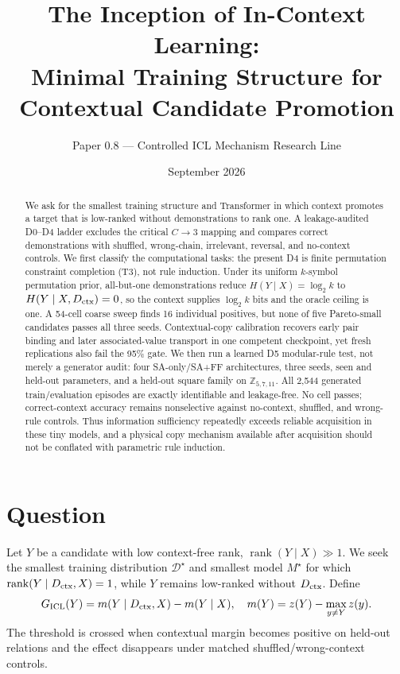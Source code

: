 \documentclass[10pt]{article}
\title{The Inception of In-Context Learning:\\Minimal Training Structure for Contextual Candidate Promotion}
\author{Paper 0.8 --- Controlled ICL Mechanism Research Line}
\date{September 2026}
\begin{document}
\maketitle
\begin{abstract}
We ask for the smallest training structure and Transformer in which context promotes a target that is low-ranked without demonstrations to rank one. A leakage-audited D0--D4 ladder excludes the critical \(C\!\to\!3\) mapping and compares correct demonstrations with shuffled, wrong-chain, irrelevant, reversal, and no-context controls. We first classify the computational tasks: the present D4 is finite permutation constraint completion (T3), not rule induction. Under its uniform \(k\)-symbol permutation prior, all-but-one demonstrations reduce \(H(Y\mid X)=\log_2 k\) to \(H(Y\mid X,D_{\rm ctx})=0\), so the context supplies \(\log_2 k\) bits and the oracle ceiling is one. A 54-cell coarse sweep finds 16 individual positives, but none of five Pareto-small candidates passes all three seeds. Contextual-copy calibration recovers early pair binding and later associated-value transport in one competent checkpoint, yet fresh replications also fail the 95\% gate. We then run a learned D5 modular-rule test, not merely a generator audit: four SA-only/SA+FF architectures, three seeds, seen and held-out parameters, and a held-out square family on \(\mathbb Z_{5,7,11}\). All 2,544 generated train/evaluation episodes are exactly identifiable and leakage-free. No cell passes; correct-context accuracy remains nonselective against no-context, shuffled, and wrong-rule controls. Thus information sufficiency repeatedly exceeds reliable acquisition in these tiny models, and a physical copy mechanism available after acquisition should not be conflated with parametric rule induction.
\end{abstract}
\section{Question}
Let \(Y\) be a candidate with low context-free rank, \(\operatorname{rank}(Y\mid X)\gg1\). We seek the smallest training distribution \(\mathcal D^\star\) and smallest model \(M^\star\) for which \(\operatorname{rank}(Y\mid D_{\rm ctx},X)=1\), while \(Y\) remains low-ranked without \(D_{\rm ctx}\).
Define
\[
G_{\rm ICL}(Y)=m(Y\mid D_{\rm ctx},X)-m(Y\mid X),\quad
m(Y)=z(Y)-\max_{y\ne Y}z(y).
\]
The threshold is crossed when contextual margin becomes positive on held-out relations and the effect disappears under matched shuffled/wrong-context controls.
\end{document}
